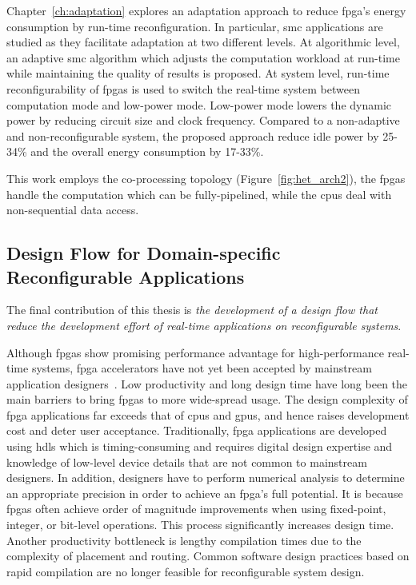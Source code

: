 Chapter~\ref{ch:adaptation} explores an adaptation approach to reduce \gls{fpga}'s energy consumption by run-time reconfiguration.
In particular, \gls{smc} applications are studied as they facilitate adaptation at two different levels.
At algorithmic level, an adaptive \gls{smc} algorithm which adjusts the computation workload at run-time while maintaining the quality of results is proposed.
At system level, run-time reconfigurability of \glspl{fpga} is used to switch the real-time system between computation mode and low-power mode.
Low-power mode lowers the dynamic power by reducing circuit size and clock frequency.
Compared to a non-adaptive and non-reconfigurable system, the proposed approach reduce idle power by 25-34\% and the overall energy consumption by 17-33\%.

This work employs the co-processing topology (Figure~\ref{fig:het_arch2}), the \glspl{fpga} handle the computation which can be fully-pipelined, while the \glspl{cpu} deal with non-sequential data access.

\subsection{Design Flow for Domain-specific Reconfigurable Applications}

The final contribution of this thesis is \textit{the development of a design flow that reduce the development effort of real-time applications on reconfigurable systems}.

Although \glspl{fpga} show promising performance advantage for high-performance real-time systems, \gls{fpga} accelerators have not yet been accepted by mainstream application designers~\cite{stitt11}.
Low productivity and long design time have long been the main barriers to bring \glspl{fpga} to more wide-spread usage.
The design complexity of \gls{fpga} applications far exceeds that of \glspl{cpu} and \glspl{gpu}, and hence raises development cost and deter user acceptance.
Traditionally, \gls{fpga} applications are developed using \glspl{hdl} which is timing-consuming and requires digital design expertise and knowledge of low-level device details that are not common to mainstream designers.
In addition, designers have to perform numerical analysis to determine an appropriate precision in order to achieve an \gls{fpga}'s full potential.
It is because \glspl{fpga} often achieve order of magnitude improvements when using fixed-point, integer, or bit-level operations.
This process significantly increases design time.
Another productivity bottleneck is lengthy compilation times due to the complexity of placement and routing.
Common software design practices based on rapid compilation are no longer feasible for reconfigurable system design.

